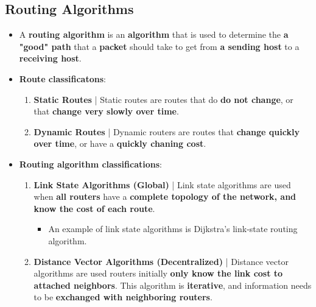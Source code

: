 \documentclass{article}
\begin{document}
    \subsection*{Routing Algorithms}
    \begin{itemize}
        \item A \textbf{routing algorithm} is an \textbf{algorithm} that is used to determine the \textbf{a "good" path} that a \textbf{packet} should take to get from \textbf{a sending host} to a \textbf{receiving host}.
        \item \textbf{Route classificatons}:
        \begin{enumerate}
            \item \textbf{Static Routes} | Static routes are routes that do \textbf{do not change}, or that \textbf{change very slowly over time}.
            \item \textbf{Dynamic Routes} | Dynamic routers are routes that \textbf{change quickly over time}, or have a \textbf{quickly chaning cost}.
        \end{enumerate}
        \item \textbf{Routing algorithm classifications}:
        \begin{enumerate}
            \item \textbf{Link State Algorithms (Global)} | Link state algorithms are used when \textbf{all routers} have a \textbf{complete topology of the network, and know the cost of each route}.
            \begin{itemize}
                \item An example of link state algorithms is Dijkstra's link-state routing algorithm.
            \end{itemize}
            \item \textbf{Distance Vector Algorithms (Decentralized)} | Distance vector algorithms are used routers initially \textbf{only know the link cost to attached neighbors}. This algorithm is \textbf{iterative}, and information needs to be \textbf{exchanged with neighboring routers}.
        \end{enumerate}
    \end{itemize}
\end{document}
